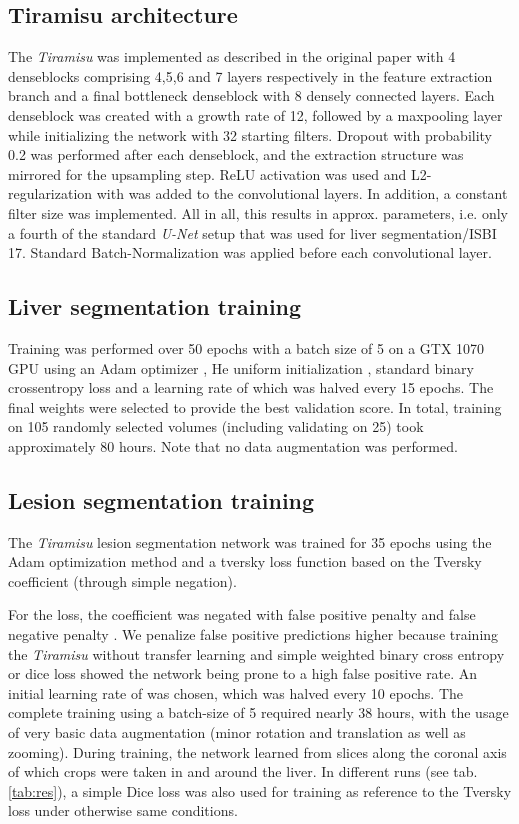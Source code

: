 \documentclass{article}
\begin{document}
\subsection{Tiramisu architecture}
The \textit{Tiramisu} was implemented as described in the original paper with 4 denseblocks comprising 4,5,6 and 7 layers respectively in the feature extraction branch and a final bottleneck denseblock with 8 densely connected layers. Each denseblock was created with a growth rate of 12, followed by a maxpooling layer while initializing the network with 32 starting filters. Dropout with probability 0.2 was performed after each denseblock, and the extraction structure was mirrored for the upsampling step. ReLU activation was used and L2-regularization with  was added to the convolutional layers. In addition, a constant  filter size was implemented. All in all, this results in approx.  parameters, i.e. only a fourth of the standard \textit{U-Net} setup that was used for liver segmentation/ISBI 17. Standard Batch-Normalization was applied before each convolutional layer.


\subsection{Liver segmentation training}
Training was performed over 50 epochs with a batch size of 5 on a GTX 1070 GPU using an Adam optimizer \cite{ADAM}, He uniform initialization \cite{heinit}, standard binary crossentropy loss and a learning rate of  which was halved every 15 epochs. The final weights were selected to provide the best validation score. In total, training on 105 randomly selected volumes (including validating on 25) took approximately 80 hours. Note that no data augmentation was performed.


\subsection{Lesion segmentation training}
The \textit{Tiramisu} lesion segmentation network was trained for 35 epochs using the Adam optimization method and a tversky loss function \cite{tversky} based on the Tversky coefficient (through simple negation).

For the loss, the coefficient was negated with false positive penalty   and false negative penalty . We penalize false positive predictions higher because training the \textit{Tiramisu} without transfer learning and simple weighted binary cross entropy or dice loss showed the network being prone to a high false positive rate. An initial learning rate of  was chosen, which was halved every 10 epochs. The complete training using a batch-size of 5 required nearly 38 hours, with the usage of very basic data augmentation (minor rotation and translation as well as zooming).
During training, the network learned from slices along the coronal axis of which  crops were taken in and around the liver. In different runs (see tab.\ref{tab:res}), a simple Dice loss was also used for training as reference to the Tversky loss under otherwise same conditions.
\end{document}
